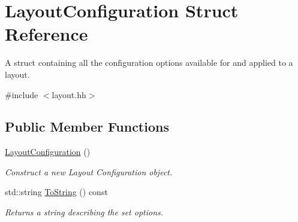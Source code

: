 \hypertarget{structLayoutConfiguration}{}\section{Layout\+Configuration Struct Reference}
\label{structLayoutConfiguration}


A struct containing all the configuration options available for and applied to a layout.  




{\ttfamily \#include $<$layout.\+hh$>$}

\subsection*{Public Member Functions}
\begin{DoxyCompactItemize}
\item 
\mbox{\label{structLayoutConfiguration_a76742074edbb0cf0fad8d8c2d2f32be4}} 
\hyperlink{structLayoutConfiguration_a76742074edbb0cf0fad8d8c2d2f32be4}{Layout\+Configuration} ()
\begin{DoxyCompactList}\small\item\em Construct a new Layout Configuration object. \end{DoxyCompactList}\item 
std\+::string \hyperlink{structLayoutConfiguration_a8be8ea09a3143cf9ba54a5069f0934d1}{To\+String} () const
\begin{DoxyCompactList}\small\item\em Returns a string describing the set options. \end{DoxyCompactList}\end{DoxyCompactItemize}
